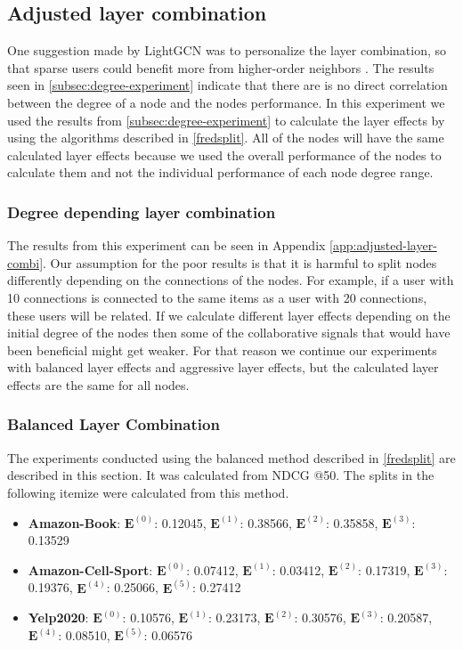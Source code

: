\subsection{Adjusted layer combination}
One suggestion made by LightGCN was to personalize the layer combination, so that sparse users could benefit more from higher-order neighbors \cite{lightgcn}.
The results seen in \autoref{subsec:degree-experiment} indicate that there are is no direct correlation between the degree of a node and the nodes performance.
In this experiment we used the results from \autoref{subsec:degree-experiment} to calculate the layer effects by using the algorithms described in \autoref{fredsplit}.
All of the nodes will have the same calculated layer effects because we used the overall performance of the nodes to calculate them and not the individual performance of each node degree range.

\subsubsection{Degree depending layer combination}
The results from this experiment can be seen in Appendix \ref{app:adjusted-layer-combi}.
Our assumption for the poor results is that it is harmful to split nodes differently depending on the connections of the nodes.
For example, if a user with 10 connections is connected to the same items as a user with 20 connections, these users will be related.
If we calculate different layer effects depending on the initial degree of the nodes then some of the collaborative signals that would have been beneficial might get weaker.
For that reason we continue our experiments with balanced layer effects and aggressive layer effects, but the calculated layer effects are the same for all nodes.

\subsubsection{Balanced Layer Combination}
The experiments conducted using the balanced method described in \autoref{fredsplit} are described in this section.
It was calculated from NDCG @50.
The splits in the following itemize were calculated from this method.
\begin{itemize}
    \item \textbf{Amazon-Book}: $\mathbf{E}^{(0)}$: 0.12045, $\mathbf{E}^{(1)}$: 0.38566, $\mathbf{E}^{(2)}$: 0.35858, $\mathbf{E}^{(3)}$:  0.13529
    \item \textbf{Amazon-Cell-Sport}: $\mathbf{E}^{(0)}$: 0.07412, $\mathbf{E}^{(1)}$: 0.03412, $\mathbf{E}^{(2)}$: 0.17319, $\mathbf{E}^{(3)}$:  0.19376, $\mathbf{E}^{(4)}$: 0.25066, $\mathbf{E}^{(5)}$: 0.27412
    \item \textbf{Yelp2020}: $\mathbf{E}^{(0)}$: 0.10576, $\mathbf{E}^{(1)}$: 0.23173, $\mathbf{E}^{(2)}$: 0.30576, $\mathbf{E}^{(3)}$: 0.20587, $\mathbf{E}^{(4)}$: 0.08510, $\mathbf{E}^{(5)}$: 0.06576
\end{itemize}

